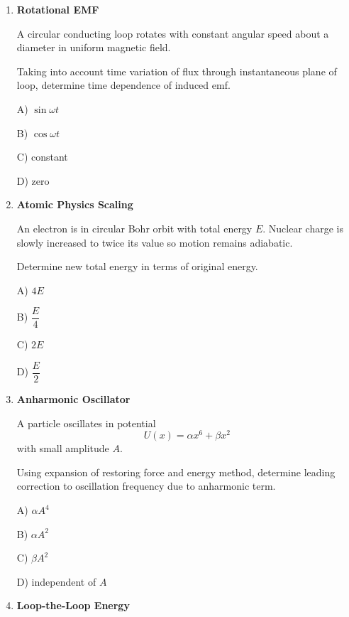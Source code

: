\documentclass[12pt]{article}
\begin{document}
\begin{enumerate}
Assuming motion remains small amplitude and friction acts as perturbation, determine leading dependence of reduction in maximum compression of spring.

A) $\mu J$

B) $\mu J^2$

C) $\mu^2$

D) independent of $\mu$

\item \textbf{Rotational EMF}

A circular conducting loop rotates with constant angular speed about a diameter in uniform magnetic field.

Taking into account time variation of flux through instantaneous plane of loop, determine time dependence of induced emf.

A) $\sin\omega t$

B) $\cos\omega t$

C) constant

D) zero

\item \textbf{Atomic Physics Scaling}

An electron is in circular Bohr orbit with total energy $E$. Nuclear charge is slowly increased to twice its value so motion remains adiabatic.

Determine new total energy in terms of original energy.

A) $4E$

B) $\dfrac{E}{4}$

C) $2E$

D) $\dfrac{E}{2}$

\item \textbf{Anharmonic Oscillator}

A particle oscillates in potential
\[
U(x)=\alpha x^6+\beta x^2
\]
with small amplitude $A$.

Using expansion of restoring force and energy method, determine leading correction to oscillation frequency due to anharmonic term.

A) $\alpha A^4$

B) $\alpha A^2$

C) $\beta A^2$

D) independent of $A$

\item \textbf{Loop-the-Loop Energy}


\end{enumerate}
\end{document}
